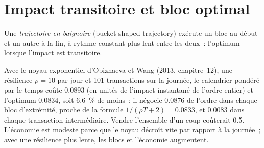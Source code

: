 \begin{omfigure}

\label{fig:mx:beyond-almgren-chriss:aim}
\end{omfigure}

\section{Impact transitoire et bloc optimal}

\begin{definition}\label{def:mx:beyond-almgren-chriss:bucket}
Une \emph{trajectoire en baignoire} (bucket-shaped trajectory) exécute un bloc au début et un autre à la fin, à rythme constant plus lent entre les deux~:
l'optimum lorsque l'impact est transitoire.
\end{definition}

Avec le noyau exponentiel d'Obizhaeva et Wang (2013, chapitre~12), une résilience $\rho=10$ par jour et 101 transactions sur la journée, le calendrier pondéré par le temps
coûte 0.0893 (en unités de l'impact instantané de l'ordre entier) et l'optimum 0.0834, soit 6.6~\% de moins~: il négocie 0.0876 de l'ordre dans chaque bloc d'extrémité,
proche de la formule $1/(\rho T+2)=0.0833$, et 0.0083 dans chaque transaction intermédiaire. Vendre l'ensemble d'un coup coûterait 0.5. L'économie est modeste parce que le
noyau décroît vite par rapport à la journée~; avec une résilience plus lente, les blocs et l'économie augmentent.

